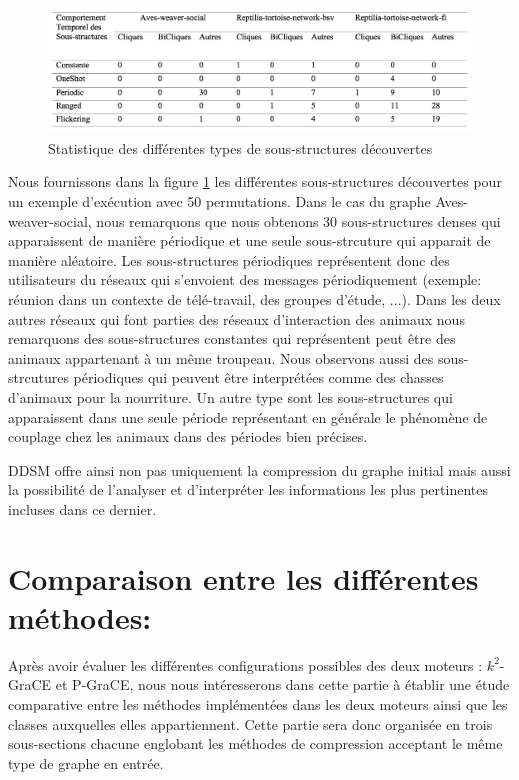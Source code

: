 	\begin{figure}[H]
		
		 \includegraphics[scale=0.38]{ressources/image/statDDSM.png}
			
			
			\caption{Statistique des différentes types de sous-structures découvertes}
			\label{fig:stat-DDSM}
		
	\end{figure}	
	
	Nous fournissons dans la figure \ref{fig:stat-DDSM} les différentes sous-structures découvertes pour un exemple d'exécution avec 50 permutations. Dans le cas du graphe Aves-weaver-social, nous remarquons que nous obtenons 30 sous-structures denses qui apparaissent de manière périodique et une seule sous-strcuture qui apparait de manière aléatoire. Les sous-structures périodiques représentent donc des utilisateurs du réseaux qui s'envoient des messages  périodiquement (exemple: réunion dans un contexte de télé-travail, des groupes d'étude, ...). Dans les deux autres réseaux qui font parties des réseaux d'interaction des animaux nous remarquons des sous-structures constantes qui représentent peut être des animaux appartenant à un même troupeau. Nous observons aussi des sous-strcutures périodiques qui peuvent être interprétées comme des chasses d'animaux pour la nourriture. Un autre type sont les sous-structures qui apparaissent dans une seule période représentant en générale le phénomène de couplage chez les animaux dans des périodes bien précises.
	
	DDSM offre ainsi non pas uniquement la compression du graphe initial mais aussi la possibilité de l'analyser et d'interpréter les informations les plus pertinentes incluses dans ce dernier.
	
	\section{Comparaison entre les différentes méthodes:}
	
	Après avoir évaluer les différentes configurations possibles des deux moteurs : $k^2$-GraCE et P-GraCE, nous nous intéresserons dans cette partie à établir une étude comparative entre les méthodes implémentées dans les deux moteurs ainsi que les classes auxquelles elles appartiennent. Cette partie sera donc organisée en trois sous-sections chacune englobant les méthodes de compression acceptant le même type de graphe en entrée.
	
